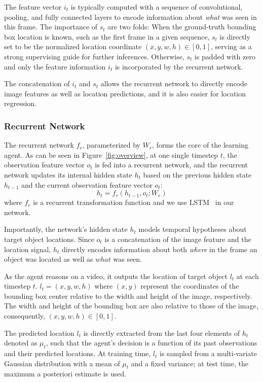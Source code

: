 \documentclass[10pt,twocolumn,letterpaper]{article}
\begin{document}
The feature vector $i_t$ is typically computed with a sequence of convolutional, pooling, and fully connected layers to encode information about \emph{what} was seen in this frame. The importance of $s_t$ are two folds: When the ground-truth bounding box location is known, such as the first frame in a given sequence, $s_t$ is directly set to be the normalized location coordinate $(x,y,w,h)\in [0,1]$, serving as a strong supervising guide for further inferences. Otherwise, $s_t$ is padded with zero and only the feature information $i_t$ is incorporated by  the recurrent network.

The concatenation of $i_t$ and $s_t$ allows the recurrent network to directly encode image features as well as location predictions, and it is also easier for location regression.

\subsubsection{Recurrent Network}
\label{subsec:recurnet}

The recurrent network $f_r$, parameterized by $W_r$, forms the core of the learning agent. As can be seen in Figure~\ref{fig:overview}, at one single timestep $t$, the observation feature vector $o_t$ is fed into a recurrent network, and the recurrent network updates its internal hidden state $h_t$ based on the previous hidden state $h_{t-1}$ and the current observation feature vector $o_t$: 
\begin{equation}
	h_t=f_{r}(h_{t-1},o_t;W_r)
    \label{eq:recurnet}
\end{equation}
where $f_r$ is a recurrent transformation function and we use LSTM~\cite{hochreiter1997long} in our network.

Importantly, the network's hidden state $h_t$ models temporal hypotheses about target object locations. Since $o_t$ is a concatenation of the image feature and the location signal, $h_t$ directly encodes information about both \emph{where} in the frame an object was located as well as $what$ was seen. 

As the agent reasons on a video, it outputs the location of target object $l_t$ at each timestep $t$. $l_t=(x,y,w,h)$
where $(x,y)$ represent the coordinates of the bounding box center relative to the width and height of the image, respectively. The width and height of the bounding box are also relative to those of the image, consequently, $(x,y,w,h)\in [0,1]$.

The predicted location $l_t$ is directly extracted from the last four elements of $h_t$ denoted as $\mu_t$, such that the agent's decision is a function of its past observations and their predicted locations. At training time, $l_t$ is sampled from a multi-variate Gaussian distribution with a mean of $\mu_t$ and a fixed variance; at test time, the maximum a posteriori estimate is used. 
\end{document}
